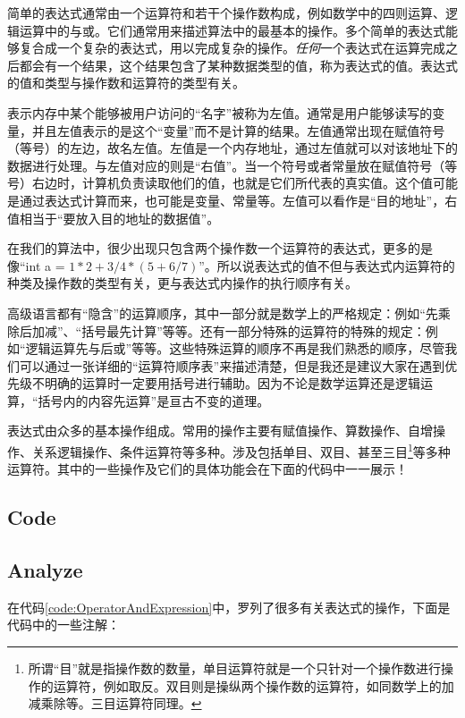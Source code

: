 简单的表达式通常由一个运算符和若干个操作数构成，例如数学中的四则运算、逻辑运算中的与或。它们通常用来描述算法中的最基本的操作。多个简单的表达式能够复合成一个复杂的表达式，用以完成复杂的操作。\emph{任何}一个表达式在运算完成之后都会有一个结果，这个结果包含了某种数据类型的值，称为表达式的值。表达式的值和类型与操作数和运算符的类型有关。

表示内存中某个能够被用户访问的“名字”被称为左值。通常是用户能够读写的变量，并且左值表示的是这个“变量”而不是计算的结果。左值通常出现在赋值符号（等号）的左边，故名左值。左值是一个内存地址，通过左值就可以对该地址下的数据进行处理。与左值对应的则是“右值”。当一个符号或者常量放在赋值符号（等号）右边时，计算机负责读取他们的值，也就是它们所代表的真实值。这个值可能是通过表达式计算而来，也可能是变量、常量等。左值可以看作是“目的地址”，右值相当于“要放入目的地址的数据值”。

在我们的算法中，很少出现只包含两个操作数一个运算符的表达式，更多的是像“int a = $1*2+3/4*(5+6/7)$”。所以说表达式的值不但与表达式内运算符的种类及操作数的类型有关，更与表达式内操作的执行顺序有关。

高级语言都有“隐含”的运算顺序，其中一部分就是数学上的严格规定：例如“先乘除后加减”、“括号最先计算”等等。还有一部分特殊的运算符的特殊的规定：例如“逻辑运算先与后或”等等。这些特殊运算的顺序不再是我们熟悉的顺序，尽管我们可以通过一张详细的“运算符顺序表”来描述清楚，但是我还是建议大家在遇到优先级不明确的运算时一定要用括号进行辅助。因为不论是数学运算还是逻辑运算，“括号内的内容先运算”是亘古不变的道理。

表达式由众多的基本操作组成。常用的操作主要有赋值操作、算数操作、自增操作、关系逻辑操作、条件运算符等多种。涉及包括单目、双目、甚至三目\footnote{所谓“目”就是指操作数的数量，单目运算符就是一个只针对一个操作数进行操作的运算符，例如取反。双目则是操纵两个操作数的运算符，如同数学上的加减乘除等。三目运算符同理。}等多种运算符。其中的一些操作及它们的具体功能会在下面的代码中一一展示！

\subsection{Code}



\subsection{Analyze}


在代码\ref{code:OperatorAndExpression}中，罗列了很多有关表达式的操作，下面是代码中的一些注解：
\showremarks


